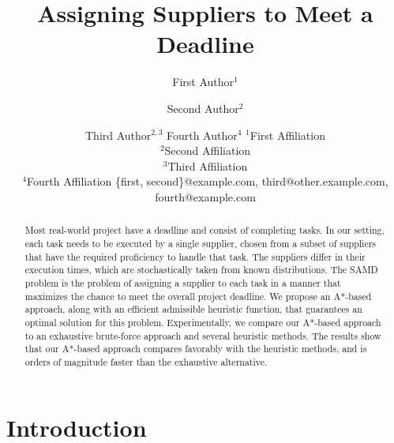 \documentclass[letterpaper]{article} %
\title{Assigning Suppliers to Meet a Deadline}
\author{
}
\author{
First Author$^1$
\and
Second Author$^2$\and
Third Author$^{2,3}$\And
Fourth Author$^4$
\affiliations
$^1$First Affiliation\\
$^2$Second Affiliation\\
$^3$Third Affiliation\\
$^4$Fourth Affiliation
\emails
\{first, second\}@example.com,
third@other.example.com,
fourth@example.com
}
\newcommand{\samd}{\ac{SAMD}\xspace}
\newcommand{\astar}{\textsc{A*}\xspace}
\begin{document}
\maketitle

\begin{abstract}
Most real-world project have a deadline and consist of completing tasks. 
In our setting, each task needs to be executed by a single supplier, chosen from a subset of suppliers that have the required proficiency to handle that task. The suppliers differ in their execution times, which are stochastically taken from known distributions. The \samd problem is the problem of assigning a supplier to each task in a manner that maximizes the chance to meet the overall project deadline. 
We propose an \astar-based approach, along with an efficient admissible heuristic function,   that guarantees an optimal solution for this problem. Experimentally, we compare our A*-based approach to an exhaustive brute-force approach and several heuristic methods. The results show that our A*-based approach compares favorably with the heuristic methods, and is orders of magnitude faster than the exhaustive alternative. 
\end{abstract}

\section{Introduction}         
\end{document}
